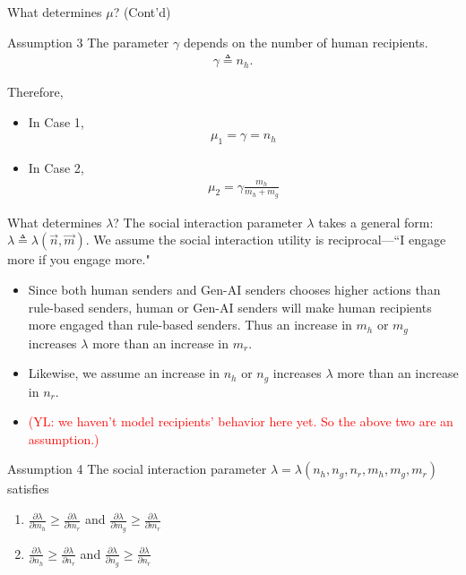 \documentclass[9pt,aspectratio=1610]{beamer}
\begin{document}
\begin{frame}{What determines $\mu$? (Cont'd)}
\begin{exampleblock}{Assumption 3}
    The parameter $\gamma$ depends on the number of human recipients.
    \begin{align*}
        \gamma \triangleq n_h.
    \end{align*}
\end{exampleblock}
\vspace{1em}
Therefore, 
\begin{itemize}
    \item In Case 1,
    \begin{align*}
        \mu_1 = \gamma = n_h
    \end{align*}
    \item In Case 2,
    \begin{align*}
        \mu_2 = \gamma\frac{m_h}{m_h+m_g}
    \end{align*}
\end{itemize}
\end{frame}

\begin{frame}{What determines $\lambda$?}
The social interaction parameter $\lambda$ takes a general form: $\lambda \triangleq \lambda(\vec{n},\vec{m})$. We assume the social interaction utility is \textcolor{orange0}{reciprocal}---``I engage more if you engage more." 
\begin{itemize}
    \item Since both human senders and Gen-AI senders chooses higher actions than rule-based senders, human or Gen-AI senders will make human recipients more engaged than rule-based senders. Thus an increase in $m_h$ or $m_g$ increases $\lambda$ more than an increase in $m_r$.
    \item Likewise, we assume an increase in $n_h$ or $n_g$ increases $\lambda$ more than an increase in $n_r$. 
    \item \textcolor{red}{(YL: we haven't model recipients' behavior here yet. So the above two are an assumption.)}
\end{itemize}

\vspace{1em}

\begin{exampleblock}{Assumption 4}
    The social interaction parameter $\lambda = \lambda(n_h,n_g,n_r,m_h,m_g,m_r)$ satisfies
    \begin{enumerate}
        \item $\frac{\partial \lambda}{\partial m_h}\geq \frac{\partial \lambda}{\partial m_r}$ and $\frac{\partial \lambda}{\partial m_g}\geq \frac{\partial \lambda}{\partial m_r}$
        \item $\frac{\partial \lambda}{\partial n_h}\geq \frac{\partial \lambda}{\partial n_r}$ and $\frac{\partial \lambda}{\partial n_g}\geq \frac{\partial \lambda}{\partial n_r}$
    \end{enumerate}
\end{exampleblock}
\end{frame}
\end{document}
